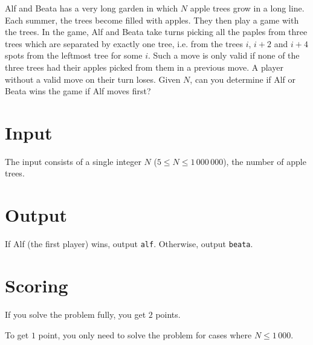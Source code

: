 Alf and Beata has a very long garden in which $N$ apple trees grow in a long line.
Each summer, the trees become filled with apples.
They then play a game with the trees.
In the game, Alf and Beata take turns picking all the paples from three trees which are separated by exactly one tree, i.e. from the trees $i$, $i + 2$ and $i + 4$ spots from the leftmost tree for some $i$.
Such a move is only valid if none of the three trees had their apples picked from them in a previous move.
A player without a valid move on their turn loses.
Given $N$, can you determine if Alf or Beata wins the game if Alf moves first?

\section*{Input}
The input consists of a single integer $N$ ($5 \le N \le 1\,000\,000$), the number of apple trees.

\section*{Output}
If Alf (the first player) wins, output \texttt{alf}.
Otherwise, output \texttt{beata}.

\section*{Scoring}
If you solve the problem fully, you get $2$ points.

To get $1$ point, you only need to solve the problem for cases where $N \le 1\,000$.
